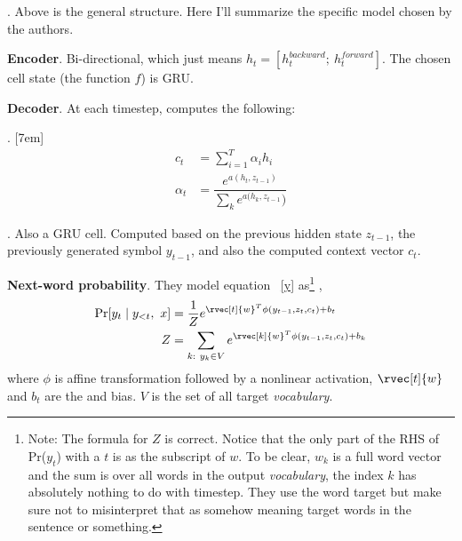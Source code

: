 \documentclass[11pt]{article}
\begin{document}
\myspace
\p {}. Above is the general structure. Here I'll summarize the specific model chosen by the authors. 
\begin{compactitem}
	\item \textbf{Encoder}. Bi-directional, which just means $h_t = \left[h_t^{backward};~h_t^{forward} \right]$. The chosen cell state (the function $f$) is GRU.
	
	\item \textbf{Decoder}. At each timestep, computes the following:
	\begin{compactitem}[$\rightarrow$]
		\item {}. 
		\begin{align}
		c_t &= \sum_{i = 1}^{T} \alpha_i h_i \\
		\alpha_t &= \dfrac{e^{a(h_t, z_{t - 1})}}{\sum_k e^{a(h_k, z_{t - 1}})} 
		\end{align}
		\item {}. Also a GRU cell. Computed based on the previous hidden state $z_{t - 1}$, the previously generated symbol $y_{t - 1}$, and also the computed context vector $c_t$. 
	\end{compactitem}
	
	\item \textbf{Next-word probability}. They model equation ~\ref{y} as\footnote{Note: The formula for $Z$ is correct. Notice that the only part of the RHS of Pr($y_t$) with a $t$ is as the subscript of $w$. To be clear, $w_k$ is a full word vector and the sum is over all words in the output \textit{vocabulary}, the index $k$ has absolutely nothing to do with timestep. They use the word target but make sure not to misinterpret that as somehow meaning target words in the sentence or something.} ,
	\begin{align}
	\Pr[y_t \mid y_{<t}, ~ x]  &= \frac{1}{Z} e^{\rvec[t]{w}^T \phi(y_{t - 1}, z_t, c_t) + b_t} \\
	Z &= \sum_{k:~y_k\in V}    e^{\rvec[k]{w}^T \phi(y_{t - 1}, z_t, c_t) + b_k}
	\end{align}
	where $\phi$ is affine transformation followed by a nonlinear activation, $\rvec[t]{w}$ and $b_t$ are the  and bias. $V$ is the set of all target \textit{vocabulary}. 
\end{compactitem}
\end{document}
